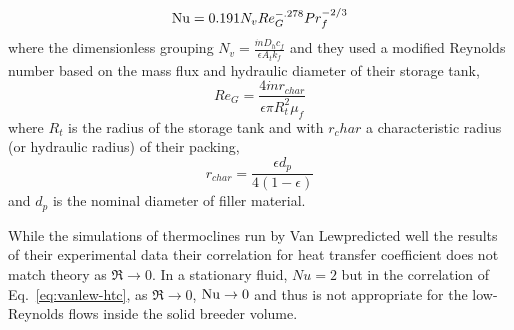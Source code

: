 

\begin{equation}\label{eq:vanlew-htc}
	\mathrm{Nu} =0.191 N_v Re_G^{-.278} Pr_f^{-2/3}
\end{equation}
where the dimensionless grouping $N_v = \frac{\dot{m}D_hc_f}{\epsilon A_tk_f}$ and they used a modified Reynolds number based on the mass flux and hydraulic diameter of their storage tank,
\begin{equation}
	Re_G=\frac{4 \dot{m} r_{char}}{\epsilon \pi R_t^2\mu_f}
\end{equation}
where $R_t$ is the radius of the storage tank and with $r_char$ a characteristic radius (or hydraulic radius) of their packing, 
\begin{equation}
	r_{char}=\frac{\epsilon d_p}{4(1-\epsilon)}
\end{equation}
and $d_p$ is the nominal diameter of filler material.

While the simulations of thermoclines run by Van Lew\etal predicted well the results of their experimental data\cite{vanlew133,Valmiki2012a} their correlation for heat transfer coefficient does not match theory as $\Re \rightarrow 0$. In a stationary fluid, $Nu = 2$ but in the correlation of Eq.~\ref{eq:vanlew-htc}, as $\Re \rightarrow 0$, $\mathrm{Nu} \rightarrow0$ and thus is not appropriate for the low-Reynolds flows inside the solid breeder volume.









